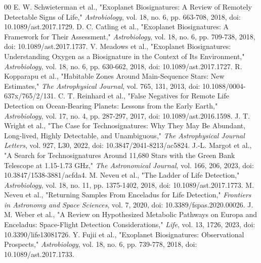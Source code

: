 \documentclass[conference]{IEEEtran}
\begin{document}
\begin{thebibliography}{00}
 E. W. Schwieterman et al., "Exoplanet Biosignatures: A Review of Remotely Detectable Signs of Life," \emph{Astrobiology}, vol. 18, no. 6, pp. 663-708, 2018, doi: 10.1089/ast.2017.1729.
 D. C. Catling et al., "Exoplanet Biosignatures: A Framework for Their Assessment," \emph{Astrobiology}, vol. 18, no. 6, pp. 709-738, 2018, doi: 10.1089/ast.2017.1737.
 V. Meadows et al., "Exoplanet Biosignatures: Understanding Oxygen as a Biosignature in the Context of Its Environment," \emph{Astrobiology}, vol. 18, no. 6, pp. 630-662, 2018, doi: 10.1089/ast.2017.1727.
 R. Kopparapu et al., "Habitable Zones Around Main-Sequence Stars: New Estimates," \emph{The Astrophysical Journal}, vol. 765, 131, 2013, doi: 10.1088/0004-637x/765/2/131.
 C. T. Reinhard et al., "False Negatives for Remote Life Detection on Ocean-Bearing Planets: Lessons from the Early Earth," \emph{Astrobiology}, vol. 17, no. 4, pp. 287-297, 2017, doi: 10.1089/ast.2016.1598.
 J. T. Wright et al., "The Case for Technosignatures: Why They May Be Abundant, Long-lived, Highly Detectable, and Unambiguous," \emph{The Astrophysical Journal Letters}, vol. 927, L30, 2022, doi: 10.3847/2041-8213/ac5824.
 J.-L. Margot et al., "A Search for Technosignatures Around 11,680 Stars with the Green Bank Telescope at 1.15-1.73 GHz," \emph{The Astronomical Journal}, vol. 166, 206, 2023, doi: 10.3847/1538-3881/acfda4.
 M. Neveu et al., "The Ladder of Life Detection," \emph{Astrobiology}, vol. 18, no. 11, pp. 1375-1402, 2018, doi: 10.1089/ast.2017.1773.
 M. Neveu et al., "Returning Samples From Enceladus for Life Detection," \emph{Frontiers in Astronomy and Space Sciences}, vol. 7, 2020, doi: 10.3389/fspas.2020.00026.
 J. M. Weber et al., "A Review on Hypothesized Metabolic Pathways on Europa and Enceladus: Space-Flight Detection Considerations," \emph{Life}, vol. 13, 1726, 2023, doi: 10.3390/life13081726.
 Y. Fujii et al., "Exoplanet Biosignatures: Observational Prospects," \emph{Astrobiology}, vol. 18, no. 6, pp. 739-778, 2018, doi: 10.1089/ast.2017.1733.
\end{thebibliography}
\end{document}
